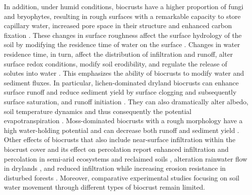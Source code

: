 In addition, under humid conditions, biocrusts have a higher proportion of fungi and bryophytes, resulting in rough surfaces with a remarkable capacity to store capillary water, increased pore space in their structure and enhanced carbon fixation \citep{RiverasMunoz2022,Weber2022}. These changes in surface roughness affect the surface hydrology of the soil by modifying the residence time of water on the surface \citep{Kidron2022}. Changes in water residence time, in turn, affect the distribution of infiltration and runoff, alter surface redox conditions, modify soil erodibility, and regulate the release of solutes into water \citep{Kalnejais2010}. This emphasizes the ability of biocrusts to modify water and sediment fluxes. In particular, lichen-dominated dryland biocrusts can enhance surface runoff and reduce sediment yield by surface clogging and subsequently surface saturation, and runoff initiation \citep{Kidron2021}. They can also dramatically alter albedo, soil temperature dynamics and thus consequently the potential evapotranspiration \citep{Liu2020b,Rutherford2017,Whitney2017,Xiao2019}. Moss-dominated biocrusts with a rough morphology have a high water-holding potential and can decrease both runoff and sediment yield \citep{Juan2023,Seitz2017,Silva2019,Zeng2025}. Other effects of biocrusts that also include near-surface infiltration within the biocrust cover and its effect on percolation report enhanced infiltration and percolation in semi-arid ecosystems \citep{Chamizo2016} and reclaimed soils \citep{Gypser2016}, alteration rainwater flow in drylands \citep{Li2022}, and reduced infiltration while increasing erosion resistance in disturbed forests \citep{Szyja2023}. Moreover, comparative experimental studies focusing on soil water movement through different types of biocrust remain limited.

